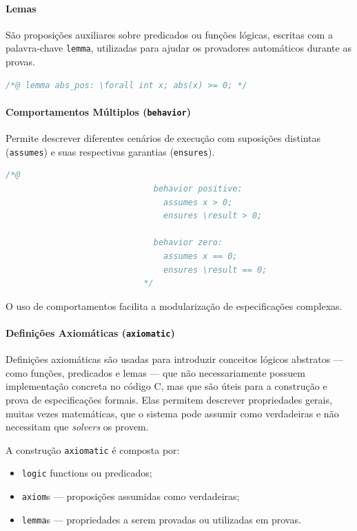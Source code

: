 \documentclass{article}
\begin{document}
\paragraph{Lemas}
São proposições auxiliares sobre predicados ou funções lógicas, escritas com a palavra-chave \texttt{lemma}, utilizadas para ajudar os provadores automáticos durante as provas.
\begin{lstlisting}[language=C]
                    /*@ lemma abs_pos: \forall int x; abs(x) >= 0; */
\end{lstlisting}

\paragraph{Comportamentos Múltiplos (\texttt{behavior})} 
Permite descrever diferentes cenários de execução com suposições distintas (\texttt{assumes}) e suas respectivas garantias (\texttt{ensures}).
\begin{lstlisting}[language=C]
                            /*@ 
                              behavior positive:
                                assumes x > 0;
                                ensures \result > 0;

                              behavior zero:
                                assumes x == 0;
                                ensures \result == 0;
                            */
\end{lstlisting}
O uso de comportamentos facilita a modularização de especificações complexas.

\paragraph{Definições Axiomáticas (\texttt{axiomatic})}

Definições axiomáticas são usadas para introduzir conceitos lógicos abstratos — como funções, predicados e lemas — que não necessariamente possuem implementação concreta no código C, mas que são úteis para a construção e prova de especificações formais. Elas permitem descrever propriedades gerais, muitas vezes matemáticas, que o sistema pode assumir como verdadeiras e não necessitam que \emph{solvers} os provem.

A construção \texttt{axiomatic} é composta por:

\begin{itemize}
    \item \texttt{logic} functions ou predicados;
    \item \texttt{axiom}s — proposições assumidas como verdadeiras;
    \item \texttt{lemma}s — propriedades a serem provadas ou utilizadas em provas.
\end{itemize}
\end{document}
